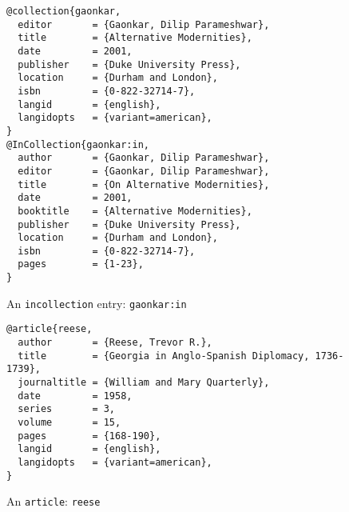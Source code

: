 \begin{figure}
\begin{Verbatim}[frame=single, fontsize=\small]
@collection{gaonkar,
  editor       = {Gaonkar, Dilip Parameshwar},
  title        = {Alternative Modernities},
  date         = 2001,
  publisher    = {Duke University Press},
  location     = {Durham and London},
  isbn         = {0-822-32714-7},
  langid       = {english},
  langidopts   = {variant=american},
}
@InCollection{gaonkar:in,
  author       = {Gaonkar, Dilip Parameshwar},
  editor       = {Gaonkar, Dilip Parameshwar},
  title        = {On Alternative Modernities},
  date         = 2001,
  booktitle    = {Alternative Modernities},
  publisher    = {Duke University Press},
  location     = {Durham and London},
  isbn         = {0-822-32714-7},
  pages        = {1-23},
}
\end{Verbatim}
\caption{An \texttt{incollection} entry: \texttt{gaonkar:in}\label{eg:incollection}}
\end{figure}

\begin{figure}
\begin{Verbatim}[frame=single, fontsize=\small]
@article{reese,
  author       = {Reese, Trevor R.},
  title        = {Georgia in Anglo-Spanish Diplomacy, 1736-1739},
  journaltitle = {William and Mary Quarterly},
  date         = 1958,
  series       = 3,
  volume       = 15,
  pages        = {168-190},
  langid       = {english},
  langidopts   = {variant=american},
}
\end{Verbatim}
\caption{An \texttt{article}: \texttt{reese}\label{eg:article}}
\end{figure}

\clearpage



















